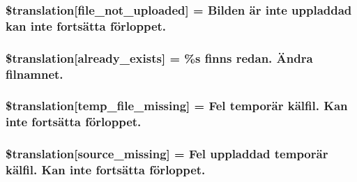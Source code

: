 \subsubsection[{\$translation}]{\setlength{\rightskip}{0pt plus 5cm}\$translation\mbox{[}\textquotesingle{}file\+\_\+not\+\_\+uploaded\textquotesingle{}\mbox{]} = \textquotesingle{}Bilden är inte uppladdad kan inte fortsätta förloppet.\textquotesingle{}}\label{class_8upload_8sv___s_e_8php_a4ce76e7be0b3a03c2b47f6d70c21832e}
\hypertarget{class_8upload_8sv___s_e_8php_afd84e910217f04139f567c41e292afa5}{}
\subsubsection[{\$translation}]{\setlength{\rightskip}{0pt plus 5cm}\$translation\mbox{[}\textquotesingle{}already\+\_\+exists\textquotesingle{}\mbox{]} = \textquotesingle{}\%s finns redan. Ändra filnamnet.\textquotesingle{}}\label{class_8upload_8sv___s_e_8php_afd84e910217f04139f567c41e292afa5}
\hypertarget{class_8upload_8sv___s_e_8php_ab0fa87a88aba2624004581eed0633325}{}
\subsubsection[{\$translation}]{\setlength{\rightskip}{0pt plus 5cm}\$translation\mbox{[}\textquotesingle{}temp\+\_\+file\+\_\+missing\textquotesingle{}\mbox{]} = \textquotesingle{}Fel temporär kälfil. Kan inte fortsätta förloppet.\textquotesingle{}}\label{class_8upload_8sv___s_e_8php_ab0fa87a88aba2624004581eed0633325}
\hypertarget{class_8upload_8sv___s_e_8php_aceaaf7355acaaf10f0ae60378d03c468}{}
\subsubsection[{\$translation}]{\setlength{\rightskip}{0pt plus 5cm}\$translation\mbox{[}\textquotesingle{}source\+\_\+missing\textquotesingle{}\mbox{]} = \textquotesingle{}Fel uppladdad temporär kälfil. Kan inte fortsätta förloppet.\textquotesingle{}}\label{class_8upload_8sv___s_e_8php_aceaaf7355acaaf10f0ae60378d03c468}
\hypertarget{class_8upload_8sv___s_e_8php_aff2427c72a2598aefa6d58df1dd18b08}{}

